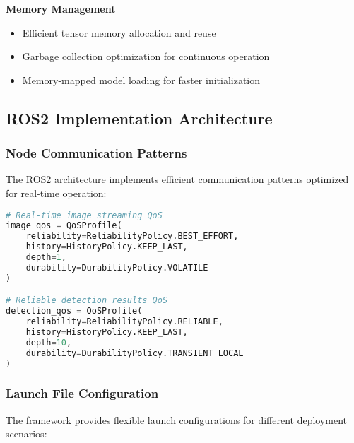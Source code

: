 \documentclass[11pt,a4paper]{article}
\begin{document}
\textbf{Memory Management}
\begin{itemize}
    \item Efficient tensor memory allocation and reuse
    \item Garbage collection optimization for continuous operation
    \item Memory-mapped model loading for faster initialization
\end{itemize}

\subsection{ROS2 Implementation Architecture}

\subsubsection{Node Communication Patterns}

The ROS2 architecture implements efficient communication patterns optimized for real-time operation:

\begin{lstlisting}[language=Python, caption=Optimized QoS Configuration]
# Real-time image streaming QoS
image_qos = QoSProfile(
    reliability=ReliabilityPolicy.BEST_EFFORT,
    history=HistoryPolicy.KEEP_LAST,
    depth=1,
    durability=DurabilityPolicy.VOLATILE
)

# Reliable detection results QoS
detection_qos = QoSProfile(
    reliability=ReliabilityPolicy.RELIABLE,
    history=HistoryPolicy.KEEP_LAST,
    depth=10,
    durability=DurabilityPolicy.TRANSIENT_LOCAL
)
\end{lstlisting}

\subsubsection{Launch File Configuration}

The framework provides flexible launch configurations for different deployment scenarios:
\end{document}
